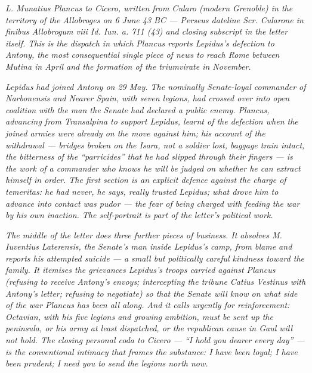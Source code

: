 
\textit{L. Munatius Plancus to Cicero, written from
Cularo (modern Grenoble) in the territory of the
Allobroges on 6 June 43 BC --- Perseus dateline
\textit{Scr. Cularone in finibus Allobrogum viii Id. Iun.
a. 711 (43)} and closing subscript in the letter itself.
This is the dispatch in which Plancus reports Lepidus's
defection to Antony, the most consequential single piece
of news to reach Rome between Mutina in April and the
formation of the triumvirate in November.}

\textit{Lepidus had joined Antony on 29 May. The
nominally Senate-loyal commander of Narbonensis and
Nearer Spain, with seven legions, had crossed over into
open coalition with the man the Senate had declared a
public enemy. Plancus, advancing from Transalpina to
support Lepidus, learnt of the defection when the joined
armies were already on the move against him; his account
of the withdrawal --- bridges broken on the Isara, not a
soldier lost, baggage train intact, the bitterness of
the ``parricides'' that he had slipped through their
fingers --- is the work of a commander who knows he
will be judged on whether he can extract himself in
order. The first section is an explicit defence against
the charge of \textit{temeritas}: he had never, he says,
really trusted Lepidus; what drove him to advance into
contact was \textit{pudor} --- the fear of being charged
with feeding the war by his own inaction. The
self-portrait is part of the letter's political work.}

\textit{The middle of the letter does three further
pieces of business. It absolves M. Iuventius Laterensis,
the Senate's man inside Lepidus's camp, from blame and
reports his attempted suicide --- a small but
politically careful kindness toward the family. It
itemises the grievances Lepidus's troops carried against
Plancus (refusing to receive Antony's envoys; intercepting
the tribune Catius Vestinus with Antony's letter; refusing
to negotiate) so that the Senate will know on what side
of the war Plancus has been all along. And it calls
urgently for reinforcement: Octavian, with his five
legions and growing ambition, must be sent up the
peninsula, or his army at least dispatched, or the
republican cause in Gaul will not hold. The closing
personal coda to Cicero --- ``I hold you dearer every
day'' --- is the conventional intimacy that frames the
substance: \textit{I have been loyal; I have been
prudent; I need you to send the legions north now}.}
